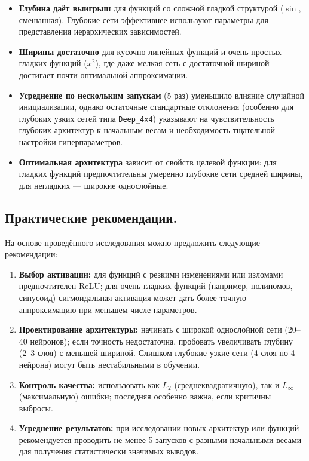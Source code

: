 \documentclass[12pt]{article}
\begin{document}
	\begin{itemize}
		\item \textbf{Глубина даёт выигрыш} для функций со сложной гладкой структурой ($\sin$, смешанная). Глубокие сети эффективнее используют параметры для представления иерархических зависимостей.
		\item \textbf{Ширины достаточно} для кусочно-линейных функций и очень простых гладких функций ($x^2$), где даже мелкая сеть с достаточной шириной достигает почти оптимальной аппроксимации.
		\item \textbf{Усреднение по нескольким запускам} (5 раз) уменьшило влияние случайной инициализации, однако остаточные стандартные отклонения (особенно для глубоких узких сетей типа \texttt{Deep\_4x4}) указывают на чувствительность глубоких архитектур к начальным весам и необходимость тщательной настройки гиперпараметров.
		\item \textbf{Оптимальная архитектура} зависит от свойств целевой функции: для гладких функций предпочтительны умеренно глубокие сети средней ширины, для негладких — широкие однослойные.
	\end{itemize}
	
	\subsection*{Практические рекомендации.}
	
	На основе проведённого исследования можно предложить следующие рекомендации:
	
	\begin{enumerate}
		\item \textbf{Выбор активации:} для функций с резкими изменениями или изломами предпочтителен ReLU; для очень гладких функций (например, полиномов, синусоид) сигмоидальная активация может дать более точную аппроксимацию при меньшем числе параметров.
		\item \textbf{Проектирование архитектуры:} начинать с широкой однослойной сети (20–40 нейронов); если точность недостаточна, пробовать увеличивать глубину (2–3 слоя) с меньшей шириной. Слишком глубокие узкие сети (4 слоя по 4 нейрона) могут быть нестабильными в обучении.
		\item \textbf{Контроль качества:} использовать как $L_2$ (среднеквадратичную), так и $L_\infty$ (максимальную) ошибки; последняя особенно важна, если критичны выбросы.
		\item \textbf{Усреднение результатов:} при исследовании новых архитектур или функций рекомендуется проводить не менее 5 запусков с разными начальными весами для получения статистически значимых выводов.
	\end{enumerate}
	
\end{document}
